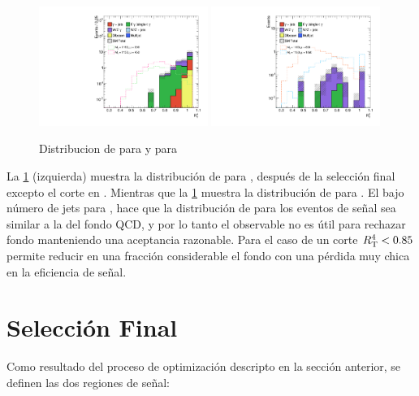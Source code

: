 \begin{figure}[!htbp]
  \centering

  \includegraphics[width=0.49\textwidth]{figures/rt4_srl}
  \includegraphics[width=0.49\textwidth]{figures/rt2_srh}

  \caption{Distribucion de {\rt} para {\SRL} y {\rtt} para {\SRH}}
  \label{fig:opt_rt}
\end{figure}

La \cref{fig:opt_rt} (izquierda) muestra la distribución de {\rtt} para {\SRH},
después de la selección final excepto el corte en {\rtt}. Mientras que la
\cref{fig:opt_rt} muestra la distribución de {\rt} para {\SRL}. El bajo número
de jets para {\SRH}, hace que la distribución de {\rtt} para los eventos de
señal sea similar a la del fondo QCD, y por lo tanto el observable no es útil
para rechazar fondo manteniendo una aceptancia razonable. Para el caso de {\SRL}
un corte $R_{\mathrm{T}}^{4} < 0.85$ permite reducir en una fracción considerable el fondo con
una pérdida muy chica en la eficiencia de señal.



\section{Selección Final}\label{sec:signal_regions}

Como resultado del proceso de optimización descripto en la sección anterior,
se definen las dos regiones de señal:

